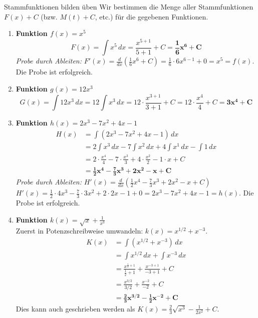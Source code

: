 \begin{loesungsumgebung}{Stammfunktionen bilden üben}
Wir bestimmen die Menge aller Stammfunktionen $F(x)+C$ (bzw. $M(t)+C$, etc.) für die gegebenen Funktionen.

\begin{enumerate}[label=(\alph*)]
    \item \textbf{Funktion $f(x) = x^5$}
    $$ F(x) = \int x^5 \, dx = \frac{x^{5+1}}{5+1} + C = \mathbf{\frac{1}{6}x^6 + C} $$
    \textit{Probe durch Ableiten:}
    $F'(x) = \frac{d}{dx}\left(\frac{1}{6}x^6 + C\right) = \frac{1}{6} \cdot 6x^{6-1} + 0 = x^5 = f(x)$. Die Probe ist erfolgreich.

    \item \textbf{Funktion $g(x) = 12x^3$}
    $$ G(x) = \int 12x^3 \, dx = 12 \int x^3 \, dx = 12 \cdot \frac{x^{3+1}}{3+1} + C = 12 \cdot \frac{x^4}{4} + C = \mathbf{3x^4 + C} $$

    \item \textbf{Funktion $h(x) = 2x^3 - 7x^2 + 4x - 1$}
    \begin{align*} H(x) &= \int (2x^3 - 7x^2 + 4x - 1) \, dx \\ &= 2\int x^3 \, dx - 7\int x^2 \, dx + 4\int x^1 \, dx - \int 1 \, dx \\ &= 2 \cdot \frac{x^4}{4} - 7 \cdot \frac{x^3}{3} + 4 \cdot \frac{x^2}{2} - 1 \cdot x + C \\ &= \mathbf{\frac{1}{2}x^4 - \frac{7}{3}x^3 + 2x^2 - x + C} \end{align*}
    \textit{Probe durch Ableiten:}
    $H'(x) = \frac{d}{dx}\left(\frac{1}{2}x^4 - \frac{7}{3}x^3 + 2x^2 - x + C\right)$
    $H'(x) = \frac{1}{2} \cdot 4x^3 - \frac{7}{3} \cdot 3x^2 + 2 \cdot 2x - 1 + 0 = 2x^3 - 7x^2 + 4x - 1 = h(x)$. Die Probe ist erfolgreich.

    \item \textbf{Funktion $k(x) = \sqrt{x} + \frac{1}{x^3}$} \\
    Zuerst in Potenzschreibweise umwandeln: $k(x) = x^{1/2} + x^{-3}$.
    \begin{align*} K(x) &= \int (x^{1/2} + x^{-3}) \, dx \\ &= \int x^{1/2} \, dx + \int x^{-3} \, dx \\ &= \frac{x^{\frac{1}{2}+1}}{\frac{1}{2}+1} + \frac{x^{-3+1}}{-3+1} + C \\ &= \frac{x^{3/2}}{3/2} + \frac{x^{-2}}{-2} + C \\ &= \mathbf{\frac{2}{3}x^{3/2} - \frac{1}{2}x^{-2} + C} \end{align*}
    Dies kann auch geschrieben werden als $K(x) = \frac{2}{3}\sqrt{x^3} - \frac{1}{2x^2} + C$.


\end{enumerate}
\end{loesungsumgebung}
